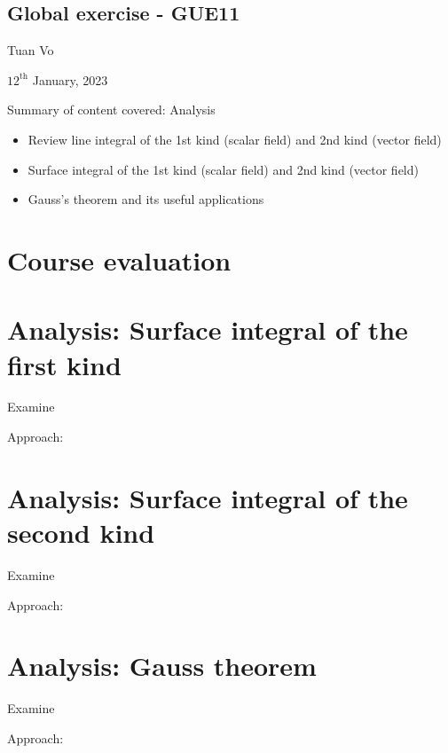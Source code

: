 \documentclass[12pt]{article}
\begin{document}
\begin{center}
	\section*{Global exercise - GUE11}
\end{center}
\begin{center}
	Tuan Vo
\end{center}
\begin{center}
	$12^{\text{th}}$ January, 2023
\end{center}
Summary of content covered: Analysis
\begin{itemize}
	\item Review line integral of the 1st kind (scalar field) and 2nd kind (vector field)
	\item Surface integral of the 1st kind (scalar field) and 2nd kind (vector field)
	\item Gauss's theorem and its useful applications
\end{itemize}
\section{Course evaluation}

\clearpage
\section{Analysis: Surface integral of the first kind}
\begin{exampleboxed}
	Examine
\end{exampleboxed}
Approach:

\clearpage
\section{Analysis: Surface integral of the second kind}
\begin{exampleboxed}
	Examine
\end{exampleboxed}
Approach:

\clearpage
\section{Analysis: Gauss theorem}
\begin{exampleboxed}
	Examine
\end{exampleboxed}
Approach:


% 
\end{document}
